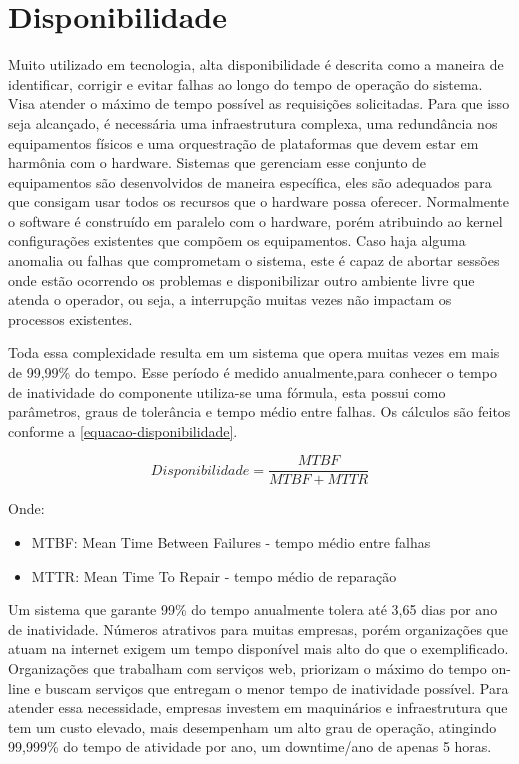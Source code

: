 \chapter{Disponibilidade}

Muito utilizado em tecnologia, alta disponibilidade é descrita como a maneira de identificar, corrigir e evitar falhas ao longo
do tempo de operação do sistema. Visa atender o máximo de tempo possível as requisições solicitadas. Para que isso seja
alcançado, é necessária uma infraestrutura complexa, uma redundância nos equipamentos físicos e uma orquestração de plataformas
que devem estar em harmônia com o hardware. Sistemas que gerenciam esse conjunto de equipamentos são desenvolvidos de maneira
específica, eles são adequados para que consigam usar todos os recursos que o hardware possa oferecer. Normalmente o software é
construído em paralelo com o hardware, porém atribuindo ao kernel configurações existentes que compõem os equipamentos.
Caso haja alguma anomalia ou falhas que comprometam o sistema, este é capaz de abortar sessões onde estão ocorrendo os problemas
e disponibilizar outro ambiente livre que atenda o operador, ou seja, a interrupção muitas vezes não impactam os processos
existentes.

Toda essa complexidade resulta em um sistema que opera muitas vezes em mais de 99,99\% do tempo. Esse período é medido
anualmente,para conhecer o tempo de inatividade do componente utiliza-se uma fórmula, esta possui como parâmetros, graus
de tolerância e tempo médio entre falhas.
Os cálculos são feitos conforme a \autoref{equacao-disponibilidade}.

\begin{equation}\label{equacao-disponibilidade}
Disponibilidade = \frac{MTBF}{MTBF + MTTR}
\end{equation}

Onde:

\begin{itemize}
	
	\item MTBF: Mean Time Between Failures - tempo médio entre falhas

	\item MTTR: Mean Time To Repair - tempo médio de reparação
		
\end{itemize}

Um sistema que garante 99\% do tempo anualmente tolera até 3,65 dias por ano de inatividade. Números atrativos para muitas
empresas, porém organizações que atuam na internet exigem um tempo disponível mais alto do que o exemplificado. Organizações
que trabalham com serviços web, priorizam o máximo do tempo on-line e buscam serviços que entregam o menor tempo de inatividade
possível. Para atender essa necessidade, empresas investem em maquinários e infraestrutura que tem um custo elevado, mais
desempenham um alto grau de operação, atingindo 99,999\% do tempo de atividade por ano, um downtime/ano de apenas 5 horas.


